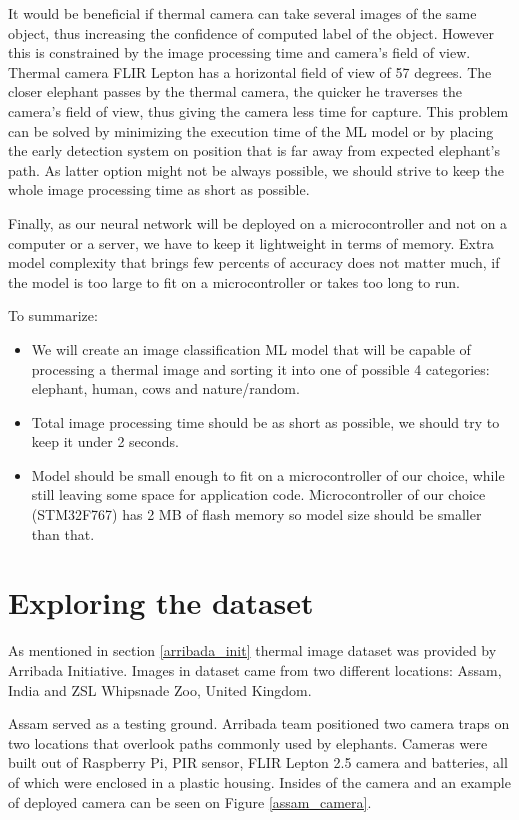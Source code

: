 It would be beneficial if thermal camera can take several images of the same object, thus increasing the confidence of computed label of the object.
However this is constrained by the image processing time and camera's field of view.
Thermal camera FLIR Lepton has a horizontal field of view of 57 degrees.
The closer elephant passes by the thermal camera, the quicker he traverses the camera's field of view, thus giving the camera less time for capture.
This problem can be solved by minimizing the execution time of the ML model or by placing the early detection system on position that is far away from expected elephant's path.
As latter option might not be always possible, we should strive to keep the whole image processing time as short as possible.

Finally, as our neural network will be deployed on a microcontroller and not on a computer or a server, we have to keep it lightweight in terms of memory.
Extra model complexity that brings few percents of accuracy does not matter much, if the model is too large to fit on a microcontroller or takes too long to run.


To summarize:
\begin{itemize}
    \item We will create an image classification ML model that will be capable of processing a thermal image and sorting it into one of possible 4 categories: elephant, human, cows and nature/random.
    \item Total image processing time should be as short as possible, we should try to keep it under 2 seconds.
    \item Model should be small enough to fit on a microcontroller of our choice, while still leaving some space for application code. Microcontroller of our choice (STM32F767) has 2 MB of flash memory so model size should be smaller than that.
\end{itemize}


\section{ Exploring the dataset} \label{exploring_dataset}

As mentioned in section \ref{arribada_init} thermal image dataset was provided by Arribada Initiative\cite{wildlabs-winners}\cite{arribada-assam}.
Images in dataset came from two different locations: Assam, India and ZSL Whipsnade Zoo, United Kingdom.

Assam served as a testing ground.
Arribada team positioned two camera traps on two locations that overlook paths commonly used by elephants.
Cameras were built out of Raspberry Pi, PIR sensor, FLIR Lepton 2.5 camera and batteries, all of which were enclosed in a plastic housing.
Insides of the camera and an example of deployed camera can be seen on Figure \ref{assam_camera}.

